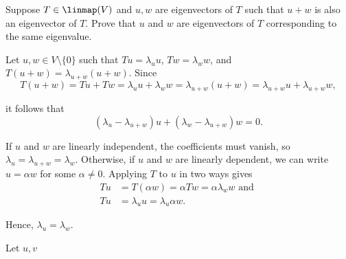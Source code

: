 \begin{xrcs}
  Suppose $T \in \linmap (V)$ and $u,w$ are eigenvectors of $T$ such that $u + w$ is also an eigenvector of $T$. Prove that $u$ and $w$ are eigenvectors of $T$ corresponding to the same eigenvalue.

  \begin{xprf}
    Let $u,w \in V \setminus \{0\}$ such that $T u = \lambda_u u$, $T w = \lambda_w w$, and $T (u+w) = \lambda_{u+w} (u+w)$. Since
    \begin{equation}
      T (u + w) =  T u + T w = \lambda_u u + \lambda_w w = \lambda_{u+w} (u + w) = \lambda_{u+w} u + \lambda_{u+w} w,
    \end{equation}

    it follows that
    \begin{equation}
      \left(\lambda_u -  \lambda_{u+w}\right) u + \left(\lambda_w -  \lambda_{u+w}\right) w = 0.
    \end{equation}

    If $u$ and $w$ are linearly independent, the coefficients must vanish, so $\lambda_u =  \lambda_{u+w} = \lambda_w$. Otherwise, if $u$ and $w$ are linearly dependent, we can write $u = \alpha w$ for some $\alpha \neq 0$. Applying $T$ to $u$ in two ways gives
    \begin{equation}
      \begin{aligned}
        T u &= T(\alpha w) = \alpha T w = \alpha \lambda_w w \text{ and }  \\
        T u &= \lambda_u u= \lambda_u \alpha w.
      \end{aligned}
    \end{equation}

    Hence, $\lambda_u = \lambda_w$.
  \end{xprf}
\end{xrcs}

\begin{xrcs}
  Let $u,v $
\end{xrcs}

